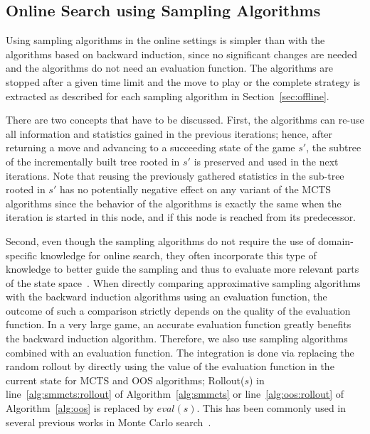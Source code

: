 \subsection{Online Search using Sampling Algorithms}

Using sampling algorithms in the online settings is simpler than with the algorithms based on backward induction, since no significant changes are needed and the algorithms do not need an evaluation function.
The algorithms are stopped after a given time limit and the move to play or the complete strategy is extracted as described for each sampling algorithm in Section~\ref{sec:offline}.

There are two concepts that have to be discussed.
First, the algorithms can re-use all information and statistics gained in the previous iterations; hence, after returning a move and advancing to a succeeding state of the game $s'$, the subtree of the incrementally built tree rooted in $s'$ is preserved and used in the next iterations.
Note that reusing the previously gathered statistics in the sub-tree rooted in $s'$ has no potentially negative effect on any variant of the MCTS algorithms since the behavior of the algorithms is exactly the same when the iteration is started in this node, and if this node is reached from its predecessor. 

Second, even though the sampling algorithms do not require the use of domain-specific knowledge for online search, they often incorporate this type of knowledge to better guide the sampling and thus to evaluate more relevant parts of the state space~\cite{Gelly07Combining,Lorentz08Amazons,Winands10MCTS-LOA,Lorentz13Breakthrough,Lanctot14Implicit}. When directly comparing approximative sampling algorithms with the backward induction algorithms using an evaluation function, the outcome of such a comparison strictly depends on the quality of the evaluation function. In a very large game, an accurate evaluation function greatly benefits the backward induction algorithm. %
Therefore, we also use sampling algorithms combined with an evaluation function. The integration is done via replacing the random rollout
by directly using the value of the evaluation function in the current state for MCTS and OOS algorithms; \ie Rollout($s$) in
line~\ref{alg:smmcts:rollout} of Algorithm~\ref{alg:smmcts} or line~\ref{alg:oos:rollout} of Algorithm~\ref{alg:oos} is replaced by $eval(s)$.
This has been commonly used in several previous works in Monte Carlo search~\cite{Lorentz08Amazons,Lorentz13Breakthrough,Lanctot14Implicit,RamanujanS11,Lanctot13MCMS}.

